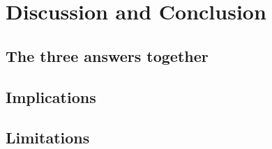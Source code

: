 \chapter{Discussion and Conclusion}
\label{ch:discussion}

\section{The three answers together}




\section{Implications}



\section{Limitations}


